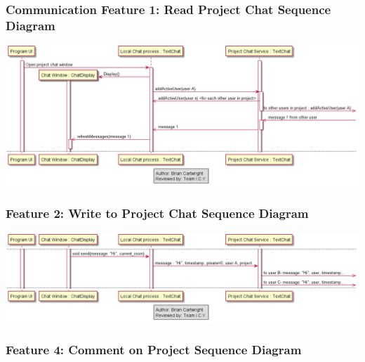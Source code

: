 \documentclass[twoside,letterpaper]{article}
\begin{document}
	\newpage
	
	
	\subsubsection[Communication Feature 1: Read Project Chat Sequence Diagram]{\rmfamily\bfseries\color{black}
		Communication Feature 1: Read Project Chat Sequence Diagram}
	\hypertarget{RefHeading22059017292}{}
	
	\bigskip
	
	\includegraphics[width=6.0in]{images/SequenceDiagrams/Comms_OpenRead}
	
	\newpage
	
	\subsubsection[Communication Feature 2: Write to Project Chat Sequence Diagram]{\rmfamily\bfseries\color{black}
		Feature 2: Write to Project Chat Sequence Diagram}
	\hypertarget{RefHeading22059017292}{}
	
	\bigskip
	
	\includegraphics[width=6.0in]{images/SequenceDiagrams/Comms_WriteToProject}
	
	\newpage
	
	
	\subsubsection[Communication Feature 4: Comment on Project Sequence Diagram]{\rmfamily\bfseries\color{black}
		Feature 4: Comment on Project Sequence Diagram}
	\hypertarget{RefHeading22059017292}{}
	
\end{document}

